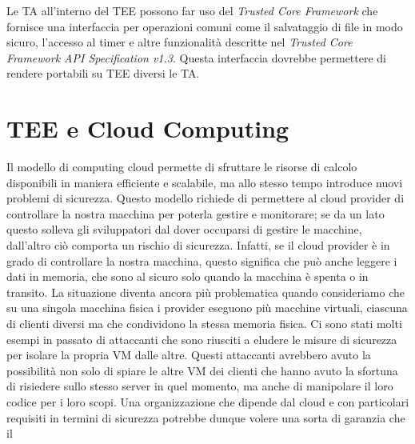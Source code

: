 \documentclass[12pt,italian]{report}
\begin{document}
Le TA all'interno del TEE possono far uso del \textit{Trusted Core Framework}
che fornisce una interfaccia per operazioni comuni come il salvataggio
di file in modo sicuro, l'accesso al timer e altre funzionalità descritte nel
\textit{Trusted Core Framework API Specification v1.3}\cite{gp2020internalapi}.
Questa interfaccia dovrebbe permettere di rendere portabili su TEE diversi
le TA.

\section{TEE e Cloud Computing}
\label{sec:tee-e-cloud-computing}
Il modello di computing cloud permette di sfruttare le risorse di calcolo
disponibili in maniera efficiente e scalabile, ma allo stesso tempo introduce
nuovi problemi di sicurezza.
Questo modello richiede di permettere al cloud provider di controllare la
nostra macchina per poterla gestire e monitorare; se da un lato questo solleva
gli sviluppatori dal dover occuparsi di gestire le macchine, dall'altro ciò
comporta un rischio di sicurezza.
Infatti, se il cloud provider è in grado di controllare la nostra macchina,
questo significa che può anche leggere i dati in memoria, che sono al sicuro
solo quando la macchina è spenta o in transito.
La situazione diventa ancora più problematica quando consideriamo che su
una singola macchina fisica i provider eseguono più macchine virtuali, ciascuna
di clienti diversi ma che condividono la stessa memoria fisica.
Ci sono stati molti esempi in passato di attaccanti che sono riusciti a eludere
le misure di sicurezza per isolare la propria VM dalle altre. %
Questi attaccanti avrebbero avuto la possibilità non solo di spiare le altre
VM dei clienti che hanno avuto la sfortuna di risiedere sullo stesso server in
quel momento, ma anche di manipolare il loro codice per i loro scopi.
Una organizzazione che dipende dal cloud e con particolari requisiti in
termini di sicurezza potrebbe dunque volere una sorta di garanzia che il
\end{document}
